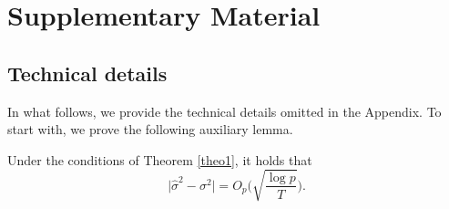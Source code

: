 \documentclass[a4paper,12pt]{article}
\numberwithin{equation}{section}
\begin{document}

{\small
\setlength{\bibsep}{0.35em}
}



\newpage
\def\thesection{\Alph{section}}
\setcounter{section}{18}
\section{Supplementary Material}


\def\theequation{S.\arabic{equation}}
\setcounter{equation}{0}
\def\thefigure{S.\arabic{figure}}
\setcounter{figure}{0}
\def\thetable{S.\arabic{table}}
\setcounter{table}{0}
\renewcommand{\baselinestretch}{1.2}\normalsize



\subsection{Technical details}


In what follows, we provide the technical details omitted in the Appendix. To start with, we prove the following auxiliary lemma.
\begin{lemmaS}\label{lemmaS1}
Under the conditions of Theorem \ref{theo1}, it holds that 
\[ \big| \hat{\sigma}^2 - \sigma^2 \big| = O_p\Big( \sqrt{\frac{\log p}{T}} \Big). \]
\end{lemmaS} 
\end{document}
